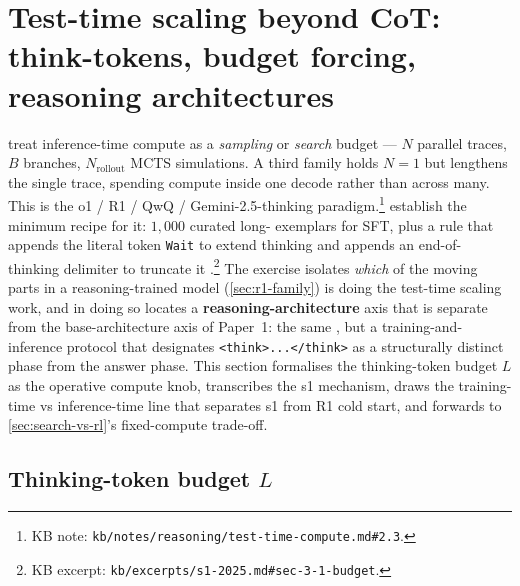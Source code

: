 
\section{Test-time scaling beyond CoT: think-tokens, budget forcing, reasoning architectures}
\label{sec:budget-forcing}

 treat inference-time
compute as a \emph{sampling} or \emph{search} budget --- $N$ parallel
traces, $B$ branches, $N_\text{rollout}$ MCTS simulations. A third
family holds $N = 1$ but lengthens the single trace, spending compute
inside one  decode rather than across many. This is the
o1 / R1 / QwQ / Gemini-2.5-thinking
paradigm.\footnote{KB note: \texttt{kb/notes/reasoning/test-time-compute.md\#2.3}.}
\citet{s1-2025} establish the minimum recipe for it: $1{,}000$
curated long- exemplars for SFT, plus a \textbf{} rule
that appends the literal token \texttt{Wait} to extend thinking and
appends an end-of-thinking delimiter to truncate it
\citep[\S 3.1]{s1-2025}.\footnote{KB excerpt:
\texttt{kb/excerpts/s1-2025.md\#sec-3-1-budget}.} The exercise isolates
\emph{which} of the moving parts in a reasoning-trained model
(\cref{sec:r1-family}) is doing the test-time scaling work, and in
doing so locates a \textbf{reasoning-architecture} axis that is
separate from the base-architecture axis of Paper~1: the same
, but a training-and-inference protocol that designates
\texttt{<think>...</think>} as a structurally distinct phase from the
answer phase. This section formalises the thinking-token budget $L$ as
the operative compute knob, transcribes the s1 mechanism, draws the
training-time vs inference-time line that separates s1 from R1 cold
start, and forwards to \cref{sec:search-vs-rl}'s fixed-compute
trade-off.

\subsection{Thinking-token budget $L$}
\label{sec:budget-knob}

